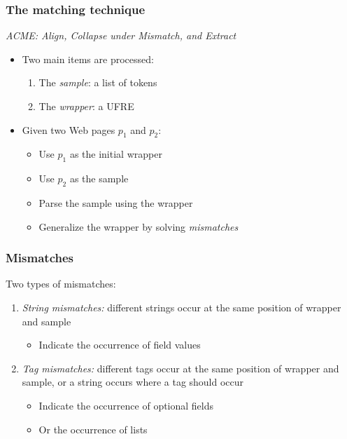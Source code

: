 \documentclass[svgnames]{beamer}
\begin{document}


\begin{frame}
    \frametitle{The matching technique}
    
    \emph{ACME: Align, Collapse under Mismatch, and Extract}
    \begin{itemize}
    \item Two main items are processed:
        \begin{enumerate}
        \item The \emph{sample}: a list of tokens
        \item The \emph{wrapper}: a UFRE
        \end{enumerate}
    \item Given two Web pages $p_1$ and $p_2$:
        \begin{itemize}
        \item Use $p_1$ as the initial wrapper
        \item Use $p_2$ as the sample
        \item Parse the sample using the wrapper
        \item Generalize the wrapper by solving \textit{mismatches}
        \end{itemize}
    \end{itemize}

\end{frame}


\begin{frame}
    \frametitle{Mismatches}
    
    Two types of mismatches:
    \begin{enumerate}
    \item \emph{String mismatches:} different strings occur at the same
        position of wrapper and sample
        \begin{itemize}
        \item Indicate the occurrence of field values
        \end{itemize}
    \item \emph{Tag mismatches:} different tags occur at the same position
        of wrapper and sample, or a string occurs where a tag should occur
        \begin{itemize}
        \item Indicate the occurrence of optional fields
        \item Or the occurrence of lists
        \end{itemize}
    \end{enumerate}

\end{frame}
\end{document}
